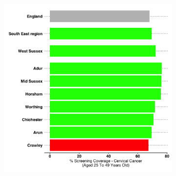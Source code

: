 \begin{figure}
    \caption[Cancer screening rates in West Sussex and its consituent lower tier local authorities.]{The screening rate at county-level for {\bf cervical cancer} (in women aged 25-49 years) is 72.2\% (Crawley, 67.3\%). Uptake had reached a 20-year low in 2018, although promotional campaigns have contributed to increases since. For {\bf breast cancer}, the screening rate at county-level is 73.1\% (Screening rates are higher than England for all districts and boroughs in West Sussex, though rates are lowest in Crawley, 65.0\%). Recent issues with the West Sussex breast programme's round length may explain the decline in screening coverage. The screening rate at county-level for {\bf bowel cancer} is 69.4\% (Crawley, 64.7\%).}\label{fig:cancer-screening}
    \vspace*{5mm}
    \centering
    \begin{subfigure}[b]{0.3\textwidth}
        \centering
        \includegraphics[width=\textwidth]{images/cervical_cancer_rag_bar.png}

\end{subfigure}
\end{figure}
